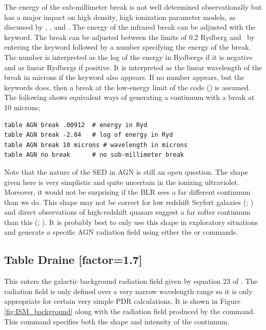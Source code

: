 The energy of the sub-millimeter break is not well determined
observationally but has a major impact on high density, high ionization
parameter models, as discussed by \citet{Ferland1989}, \citet{FerlandPeterson1992}, and \citet{Ferland1999a}.  The energy of the infrared break can be
adjusted with the  keyword.
The break can be adjusted between the
limits of 0.2 Rydberg and \emm\
by entering the keyword 
followed by a number specifying the energy of the break.  The number is
interpreted as the log of the energy in Rydbergs if it is negative and as
linear Rydbergs if positive.  It is interpreted as the linear wavelength
of the break in microns if the keyword \cdCommand{microns} also appears.
If no number appears, but the keywords \cdCommand{no break} does,
then a break at the low-energy
limit of the code (\emm ) is assumed.
The following shows
equivalent ways of generating a continuum with a break at 10 microns;
\begin{verbatim}
table AGN break .00912  # energy in Ryd
table AGN break -2.04   # log of energy in Ryd
table AGN break 10 microns # wavelength in microns
table AGN no break      # no sub-millimeter break
\end{verbatim}
Note that the nature of the SED in AGN is still an open question.  The
shape given here is very simplistic and quite uncertain in the
ionizing ultraviolet.  Moreover, it would not be surprising if the BLR
sees a far different continuum than we do.  This shape may not be
correct for low redshift Seyfert galaxies (\citealp{Binette1989};
\citealp{Clavel1990}) and direct observations of high-redshift quasars
suggest a far softer continuum than this (\citealp{Zheng1997};
\citealp{KoristaFerlandBaldwin1997}).
It is
probably best to only use this shape in exploratory situations and
generate a specific AGN radiation field using either the
 or  commands.

\subsection{Table Draine [factor=1.7]}

This enters the galactic background radiation field given by
equation 23 of \citet{Draine1996}.
The radiation field is only defined over a very
narrow wavelength range so it is only appropriate for
certain very simple PDR calculations.
It is shown in Figure \ref{fig:ISM_background} along with the
radiation field produced
by the  command.
This command specifies both the shape and
intensity of the continuum.

